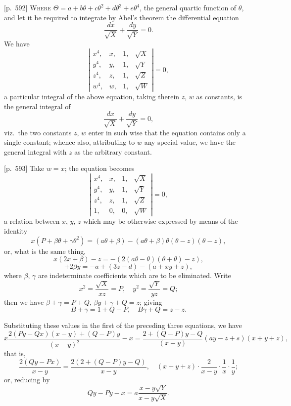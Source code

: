 \documentclass[11pt,a4paper]{book}
\begin{document}
\bigskip

[p.~592] \textsc{Where} $\Theta = a + b\theta + c\theta^2 + d\theta^3 + e\theta^4$, the general quartic function of $\theta$, and let it be required to integrate by Abel's theorem the differential equation
\[
\frac{dx}{\sqrt{X}} + \frac{dy}{\sqrt{Y}} = 0.
\]
We have
\[
\left|
\begin{array}{cccc}
x^4, & x, & 1, & \sqrt{X} \\
y^4, & y, & 1, & \sqrt{Y} \\
z^4, & z, & 1, & \sqrt{Z} \\
w^4, & w, & 1, & \sqrt{W}
\end{array}
\right| = 0,
\]
a particular integral of the above equation, taking therein $z$, $w$ as constants, is the general integral of
\[
\frac{dx}{\sqrt{X}} + \frac{dy}{\sqrt{Y}} = 0,
\]
viz.\ the two constants $z$, $w$ enter in such wise that the equation contains only a single constant; whence also, attributing to $w$ any special value, we have the general integral with $z$ as the arbitrary constant.

\bigskip

[p.~593] Take $w = x$; the equation becomes
\[
\left|
\begin{array}{cccc}
x^4, & x, & 1, & \sqrt{X} \\
y^4, & y, & 1, & \sqrt{Y} \\
z^4, & z, & 1, & \sqrt{Z} \\
1, & 0, & 0, & \sqrt{W}
\end{array}
\right| = 0,
\]
a relation between $x$, $y$, $z$ which may be otherwise expressed by means of the identity
\[
x (P + \beta\theta + \gamma\theta^2) = (a\theta + \beta) - (a\theta + \beta) \theta (\theta - z) (\theta - z),
\]
or, what is the same thing,
\[
x (2x + \beta) - z = -(2(a\theta - \theta)(\theta + \theta) - z),
\]
\[
+ 2\beta y = -a + (3z - d) - (a + xy + z),
\]
where $\beta$, $\gamma$ are indeterminate coefficients which are to be eliminated. Write
\[
x^2 = \frac{\sqrt{X}}{x z} = P, \quad y^2 = \frac{\sqrt{Y}}{y z} = Q;
\]
then we have $\beta + \gamma = P + Q$, $\beta y + \gamma + Q = z$; giving
\[
B + \gamma = 1 + Q - P, \quad B\gamma + Q = z - z.
\]

Substituting these values in the first of the preceding three equations, we have
\[
x \frac{2(Py - Qx)(x - y) + (Q - P)y}{(x - y)^2} - x = \frac{2 + (Q - P)y - Q}{(x - y)} \left( a y - z + s \right) (x + y + z),
\]
that is,
\[
\frac{2(Qy - Px)}{x - y} = \frac{2(2 + (Q - P)y - Q)}{x - y}, \quad (x + y + z) \cdot \frac{2}{x - y} \cdot \frac{1}{x} \cdot \frac{1}{y};
\]
or, reducing by
\[
Qy - Py - x = a\frac{x - y\sqrt{Y}}{x - y \sqrt{X}}.
\]
\end{document}
